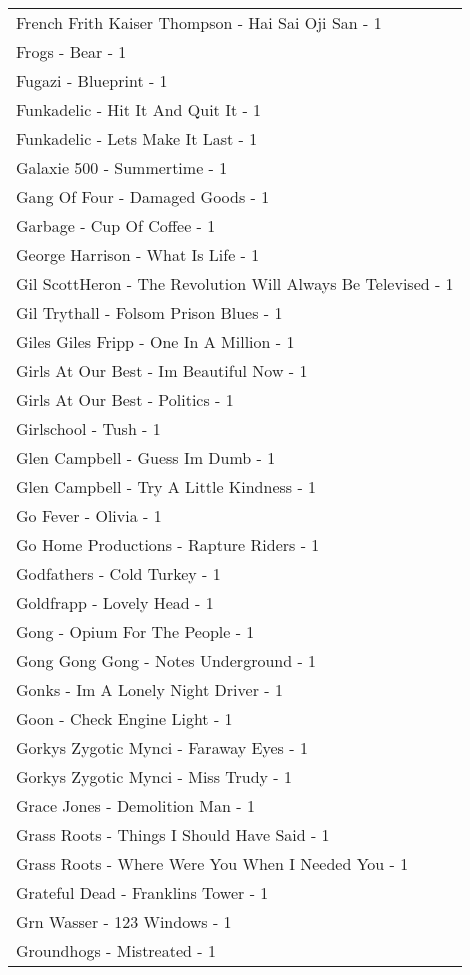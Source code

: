 \documentclass[
]{article}
\begin{document}
\begin{longtable}{l}
French Frith Kaiser Thompson - Hai Sai Oji San - 1 \\ 
Frogs - Bear - 1 \\ 
Fugazi - Blueprint - 1 \\ 
Funkadelic - Hit It And Quit It - 1 \\ 
Funkadelic - Lets Make It Last - 1 \\ 
Galaxie 500 - Summertime - 1 \\ 
Gang Of Four - Damaged Goods - 1 \\ 
Garbage - Cup Of Coffee - 1 \\ 
George Harrison - What Is Life - 1 \\ 
Gil ScottHeron - The Revolution Will Always Be Televised - 1 \\ 
Gil Trythall - Folsom Prison Blues - 1 \\ 
Giles Giles Fripp - One In A Million - 1 \\ 
Girls At Our Best - Im Beautiful Now - 1 \\ 
Girls At Our Best - Politics - 1 \\ 
Girlschool - Tush - 1 \\ 
Glen Campbell - Guess Im Dumb - 1 \\ 
Glen Campbell - Try A Little Kindness - 1 \\ 
Go Fever - Olivia - 1 \\ 
Go Home Productions - Rapture Riders - 1 \\ 
Godfathers - Cold Turkey - 1 \\ 
Goldfrapp - Lovely Head - 1 \\ 
Gong - Opium For The People - 1 \\ 
Gong Gong Gong - Notes Underground - 1 \\ 
Gonks - Im A Lonely Night Driver - 1 \\ 
Goon - Check Engine Light - 1 \\ 
Gorkys Zygotic Mynci - Faraway Eyes - 1 \\ 
Gorkys Zygotic Mynci - Miss Trudy - 1 \\ 
Grace Jones - Demolition Man - 1 \\ 
Grass Roots - Things I Should Have Said - 1 \\ 
Grass Roots - Where Were You When I Needed You - 1 \\ 
Grateful Dead - Franklins Tower - 1 \\ 
Grn Wasser - 123 Windows - 1 \\ 
Groundhogs - Mistreated - 1 \\ 

\end{longtable}
\end{document}
